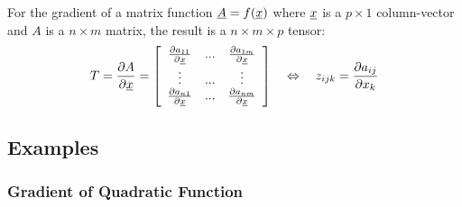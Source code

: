 For the gradient of a matrix function $\underline{A} = f(\underline{x})$ where $\underline{x}$ is a $p \times 1$ column-vector and $A$ is a $n \times m$ matrix, the result is a $n \times m \times p$ tensor:
\begin{align}
 T = \frac{\partial A}{\partial \underline{x}} =
 \left[ \begin{array}{c c c }
         \frac{\partial a_{11}}{\partial \underline{x}}   & ... & \frac{\partial a_{1m}}{\partial \underline{x}} \\
         \vdots                             & ... & \vdots                          \\
         \frac{\partial a_{n1}}{\partial \underline{x}}   & ... & \frac{\partial a_{nm}}{\partial \underline{x}} \\
 \end{array} \right]
 \quad\Leftrightarrow\quad
 z_{ijk} = \frac{\partial a_{ij}}{\partial x_k}
\end{align}








\newpage

\subsection{Examples}

\subsubsection{Gradient of Quadratic Function}

